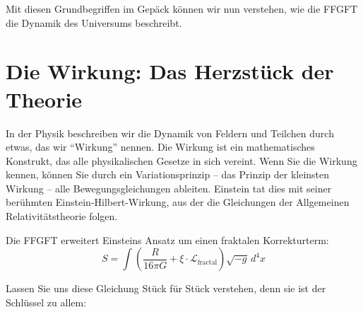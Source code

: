 Mit diesen Grundbegriffen im Gepäck können wir nun verstehen, wie die FFGFT die Dynamik des Universums beschreibt.

\section{Die Wirkung: Das Herzstück der Theorie}

In der Physik beschreiben wir die Dynamik von Feldern und Teilchen durch etwas, das wir \enquote{Wirkung} nennen. Die Wirkung ist ein mathematisches Konstrukt, das alle physikalischen Gesetze in sich vereint. Wenn Sie die Wirkung kennen, können Sie durch ein Variationsprinzip – das Prinzip der kleinsten Wirkung – alle Bewegungsgleichungen ableiten. Einstein tat dies mit seiner berühmten Einstein-Hilbert-Wirkung, aus der die Gleichungen der Allgemeinen Relativitätstheorie folgen.

Die FFGFT erweitert Einsteins Ansatz um einen fraktalen Korrekturterm:
\begin{equation}
S = \int \left( \frac{R}{16\pi G} + \xi \cdot \mathcal{L}_{\text{fractal}} \right) \sqrt{-g} \, d^4x
\end{equation}

Lassen Sie uns diese Gleichung Stück für Stück verstehen, denn sie ist der Schlüssel zu allem:

